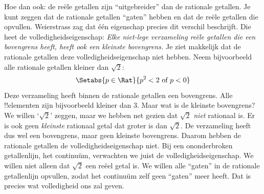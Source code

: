 \documentclass[../../../include/open-logic-section]{subfiles}
\begin{document}
Hoe dan ook: de reële getallen zijn ``uitgebreider'' dan de rationale
getallen. Je kunt zeggen dat de rationale getallen ``gaten'' hebben en
dat de reële getallen die opvullen. Weierstrass zag dat één eigenschap
precies dit verschil beschrijft. Die heet de volledigheidseigenschap:
\emph{Elke niet-lege verzameling reële getallen die een bovengrens
heeft, heeft ook een kleinste bovengrens.}
Je ziet makkelijk dat de rationale getallen deze
volledigheidseigenschap niet hebben. Neem bijvoorbeeld alle rationale
getallen kleiner dan $\sqrt{2}$:
\[
	\Setabs{p \in \Rat}{p^2 < 2 \text{ of }p < 0}
\]
Deze verzameling heeft binnen de rationale getallen een bovengrens.
Alle !!{element}en zijn bijvoorbeeld kleiner dan $3$. Maar wat is de
kleinste bovengrens? We willen `$\sqrt{2}$' zeggen, maar we hebben net
gezien dat $\sqrt{2}$ \emph{niet} rationaal is. Er is ook geen
\emph{kleinste} rationaal getal dat groter is dan $\sqrt{2}$. De
verzameling heeft dus wel een bovengrens, maar geen kleinste
bovengrens. Daarom hebben de rationale getallen de
volledigheidseigenschap niet.
Bij een ononderbroken getallenlijn, het continuüm, verwachten we juist
de volledigheidseigenschap. We willen niet alleen dat $\sqrt{2}$ een
reëel getal is. We willen alle ``gaten'' in de rationale getallenlijn
opvullen, zodat het continuüm zelf geen ``gaten'' meer heeft. Dat is
precies wat volledigheid ons zal geven.
\end{document}
